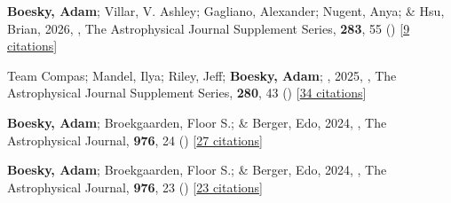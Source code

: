 \item[{\color{numcolor}\scriptsize4}] \textbf{Boesky, Adam}; Villar, V. Ashley; Gagliano, Alexander; Nugent, Anya; \& Hsu, Brian, 2026, , The Astrophysical Journal Supplement Series, \textbf{283}, 55 () [\href{https://ui.adsabs.harvard.edu/abs/2026ApJS..283...55B}{9 citations}]

\item[{\color{numcolor}\scriptsize3}] Team Compas; Mandel, Ilya; Riley, Jeff; \textbf{Boesky, Adam}; \etal, 2025, , The Astrophysical Journal Supplement Series, \textbf{280}, 43 () [\href{https://ui.adsabs.harvard.edu/abs/2025ApJS..280...43T}{34 citations}]

\item[{\color{numcolor}\scriptsize2}] \textbf{Boesky, Adam}; Broekgaarden, Floor S.; \& Berger, Edo, 2024, , The Astrophysical Journal, \textbf{976}, 24 () [\href{https://ui.adsabs.harvard.edu/abs/2024ApJ...976...24B}{27 citations}]

\item[{\color{numcolor}\scriptsize1}] \textbf{Boesky, Adam}; Broekgaarden, Floor S.; \& Berger, Edo, 2024, , The Astrophysical Journal, \textbf{976}, 23 () [\href{https://ui.adsabs.harvard.edu/abs/2024ApJ...976...23B}{23 citations}]